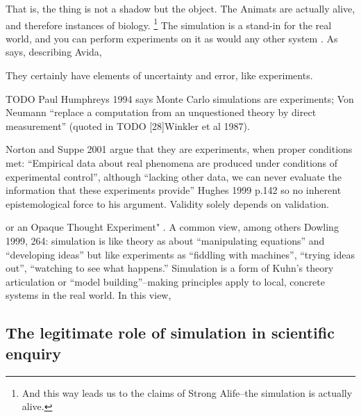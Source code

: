 \label{simulations-are-themselves-an-instance-of-the-thing}

That is, the thing is not a shadow but the object. The Animats are
actually alive, and therefore instances of biology.
\footnote{And this way leads us to the claims of Strong Alife--the simulation is actually alive.}
The simulation is a stand-in for the real world, and you can perform
experiments on it as would any other system
\autocite[31]{Winsberg2010}. As \autocite{Adami2002} says, describing
Avida,


They certainly have elements of uncertainty and error, like experiments.

TODO Paul Humphreys 1994 says Monte Carlo simulations are experiments; Von
Neumann ``replace a computation from an unquestioned theory by direct
measurement'' (quoted in TODO [28]{Winkler et al 1987}).

Norton and Suppe 2001 argue that they are experiments, when proper conditions met:
``Empirical
data about real phenomena are produced under conditions of experimental
control'', although ``lacking other data, we can never evaluate the
information that these experiments provide'' Hughes 1999 p.142 so no inherent epistemological force to his
argument. Validity solely depends on validation.

\label{a-third-way-neither-experimental-or-theoretical}

\autocite[31]{Winsberg2010} or an Opaque Thought Experiment"
\autocite{DiPaolo2000}. A common view, among others Dowling 1999, 264:
simulation is like theory as about ``manipulating equations'' and
``developing ideas'' but like experiments as ``fiddling with machines'',
``trying ideas out'', ``watching to see what happens.'' Simulation is a
form of Kuhn's theory articulation or ``model building''--making
principles apply to local, concrete systems in the real world. In this
view, 

\subsection{The legitimate role of simulation in scientific
	enquiry}\label{the-legitimate-role-of-simulation-in-scientific-enquiry}

